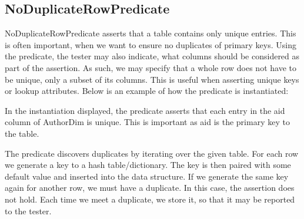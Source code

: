 \subsection{NoDuplicateRowPredicate}
NoDuplicateRowPredicate asserts that a table contains only unique entries. This is often important, when we want to ensure no duplicates of primary keys. Using the predicate, the tester may also indicate, what columns should be considered as part of the assertion. As such, we may specify that a whole row does not have to be unique, only a subset of its columns. This is useful when asserting unique keys or lookup attributes. Below is an example of how the predicate is instantiated:

In the instantiation displayed, the predicate asserts that  each entry in the aid column of AuthorDim is unique. This is important as aid is the primary key to the table. 

The predicate discovers duplicates by iterating over the given table. For each row we generate a key to a hash table/dictionary. The key is then paired with some default value and inserted into the data structure. If we generate the same key again for another row, we must have a duplicate. In this case, the assertion does not hold. Each time we meet a duplicate, we store it, so that it may be reported to the tester.

